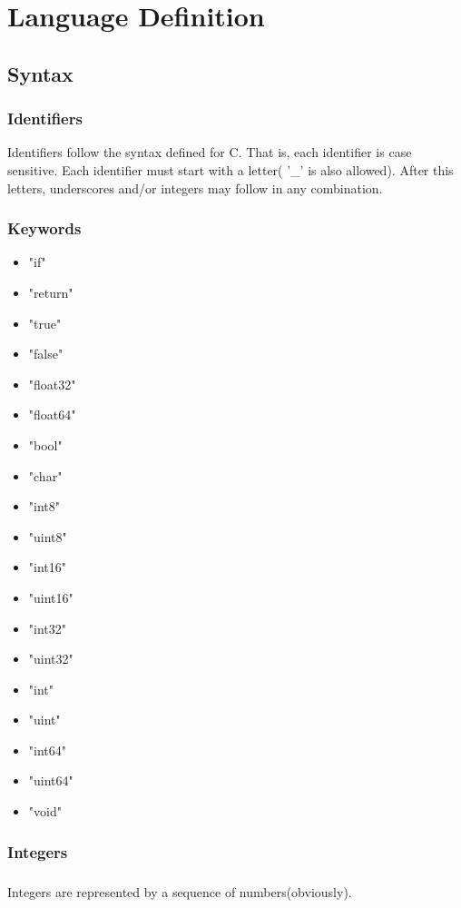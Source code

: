 \documentclass{report}
\begin{document}
\tableofcontents

\chapter{Language Definition}
	\section{Syntax}
		\subsection{Identifiers}
			Identifiers follow the syntax defined for C. That is, each identifier is case sensitive. Each identifier must start with a letter( '\_' is also allowed). After this letters, underscores and/or integers may follow in any combination.
		\subsection{Keywords}
			\begin{itemize}
				\item "if"
				\item "return"
				\item "true"
				\item "false"
				\item "float32"
				\item "float64"
				\item "bool"
				\item "char"
				\item "int8"
				\item "uint8"
				\item "int16"
				\item "uint16"
				\item "int32"
				\item "uint32"
				\item "int"
				\item "uint"
				\item "int64"
				\item "uint64"
				
				\item "void"
			\end{itemize}

	\subsection{Integers}
		\paragraph{}
			Integers are represented by a sequence of numbers(obviously).
\end{document}
